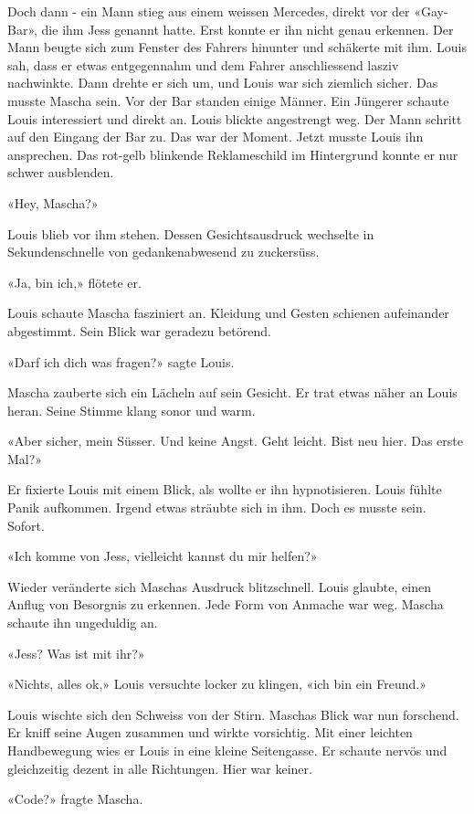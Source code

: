 Doch dann - ein Mann stieg aus einem weissen Mercedes, direkt vor der «Gay-Bar», die
ihm Jess genannt hatte. Erst konnte er ihn nicht genau erkennen. Der Mann beugte sich zum
Fenster des Fahrers hinunter und schäkerte mit ihm. Louis sah, dass er etwas entgegennahm 
und dem Fahrer anschliessend lasziv nachwinkte.
Dann drehte er sich um, und Louis war sich ziemlich sicher. Das musste
Mascha sein.
Vor der Bar standen einige Männer. Ein Jüngerer schaute Louis
interessiert und direkt an. Louis blickte angestrengt weg.
Der Mann schritt auf den Eingang der Bar zu. Das war der Moment. Jetzt
musste Louis ihn ansprechen. Das rot-gelb blinkende Reklameschild im
Hintergrund konnte er nur schwer ausblenden.

«Hey, Mascha?»

Louis blieb vor ihm stehen. Dessen Gesichtsausdruck wechselte in
Sekundenschnelle von gedankenabwesend zu zuckersüss.

«Ja, bin ich,» flötete er.

Louis schaute Mascha fasziniert an. Kleidung und Gesten schienen aufeinander abgestimmt. Sein Blick war geradezu betörend. 

«Darf ich dich was fragen?» sagte Louis.

Mascha zauberte sich ein Lächeln auf sein Gesicht. Er trat etwas näher
an Louis heran. Seine Stimme klang sonor und warm.

«Aber sicher, mein Süsser. Und keine Angst. Geht leicht. Bist neu hier.
Das erste Mal?»

Er fixierte Louis mit einem Blick, als wollte er ihn hypnotisieren.
Louis fühlte Panik aufkommen. Irgend etwas sträubte sich in ihm. Doch es
musste sein. Sofort.

«Ich komme von Jess, vielleicht kannst du mir helfen?»

Wieder veränderte sich Maschas Ausdruck blitzschnell. 
Louis glaubte, einen Anflug von Besorgnis zu erkennen. Jede Form von Anmache war weg.
Mascha schaute ihn ungeduldig an.

«Jess? Was ist mit ihr?»

«Nichts, alles ok,» Louis versuchte locker zu klingen, «ich bin ein Freund.»

Louis wischte sich den Schweiss von der Stirn.
Maschas Blick war nun forschend. Er kniff seine Augen zusammen und
wirkte vorsichtig. Mit einer leichten Handbewegung wies er Louis in eine
kleine Seitengasse. Er schaute nervös und gleichzeitig dezent in alle
Richtungen. Hier war keiner.

«Code?» fragte Mascha.

